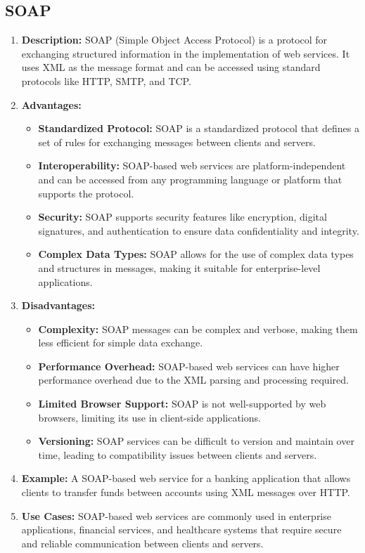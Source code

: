 \documentclass[11pt]{article}
\begin{document}
\subsection{SOAP}
\begin{enumerate}
    \item \textbf{Description:} SOAP (Simple Object Access Protocol) is a protocol for exchanging structured information in the implementation of web services. It uses XML as the message format and can be accessed using standard protocols like HTTP, SMTP, and TCP.
    \item \textbf{Advantages:}
          \begin{itemize}
              \item \textbf{Standardized Protocol:} SOAP is a standardized protocol that defines a set of rules for exchanging messages between clients and servers.
              \item \textbf{Interoperability:} SOAP-based web services are platform-independent and can be accessed from any programming language or platform that supports the protocol.
              \item \textbf{Security:} SOAP supports security features like encryption, digital signatures, and authentication to ensure data confidentiality and integrity.
              \item \textbf{Complex Data Types:} SOAP allows for the use of complex data types and structures in messages, making it suitable for enterprise-level applications.
          \end{itemize}
    \item \textbf{Disadvantages:}
          \begin{itemize}
              \item \textbf{Complexity:} SOAP messages can be complex and verbose, making them less efficient for simple data exchange.
              \item \textbf{Performance Overhead:} SOAP-based web services can have higher performance overhead due to the XML parsing and processing required.
              \item \textbf{Limited Browser Support:} SOAP is not well-supported by web browsers, limiting its use in client-side applications.
              \item \textbf{Versioning:} SOAP services can be difficult to version and maintain over time, leading to compatibility issues between clients and servers.
          \end{itemize}
    \item \textbf{Example:} A SOAP-based web service for a banking application that allows clients to transfer funds between accounts using XML messages over HTTP.
    \item \textbf{Use Cases:} SOAP-based web services are commonly used in enterprise applications, financial services, and healthcare systems that require secure and reliable communication between clients and servers.
\end{enumerate}
\end{document}
